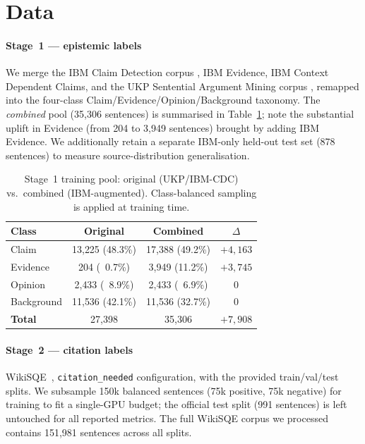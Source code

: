 \documentclass[conference]{IEEEtran}
\begin{document}
\section{Data}

\paragraph{Stage~1 — epistemic labels}
We merge the IBM Claim Detection corpus \cite{levy2014context}, IBM Evidence,
IBM Context Dependent Claims, and the UKP Sentential Argument Mining
corpus \cite{stab2014annotating}, remapped into the four-class
Claim/Evidence/Opinion/Background taxonomy. The \emph{combined} pool
(35{,}306 sentences) is summarised in Table~\ref{tab:s1corpus}; note the
substantial uplift in Evidence (from 204 to 3{,}949 sentences) brought by
adding IBM Evidence. We additionally retain a separate IBM-only held-out
test set (878 sentences) to measure source-distribution
generalisation.

\begin{table}[t]
\centering
\caption{Stage~1 training pool: original (UKP/IBM-CDC) vs.\ combined
(IBM-augmented). Class-balanced sampling is applied at training time.}
\label{tab:s1corpus}
\small
\setlength{\tabcolsep}{4.5pt}
\begin{tabular}{lccc}
\toprule
\textbf{Class} & \textbf{Original} & \textbf{Combined} & \textbf{$\Delta$} \\
\midrule
Claim       & 13{,}225 (48.3\%) & 17{,}388 (49.2\%) & $+4{,}163$ \\
Evidence    &     204 (~0.7\%) &  3{,}949 (11.2\%) & $+3{,}745$ \\
Opinion     &  2{,}433 (~8.9\%) &  2{,}433 (~6.9\%) & $0$        \\
Background  & 11{,}536 (42.1\%) & 11{,}536 (32.7\%) & $0$        \\
\midrule
\textbf{Total} & 27{,}398 & 35{,}306 & $+7{,}908$ \\
\bottomrule
\end{tabular}
\end{table}

\paragraph{Stage~2 — citation labels}
WikiSQE~\cite{wikisqe}, \texttt{citation\_needed} configuration, with the
provided train/val/test splits. We subsample 150k balanced sentences (75k
positive, 75k negative) for training to fit a single-GPU budget; the
official test split (991 sentences) is left untouched for all
reported metrics. The full WikiSQE corpus we processed contains 151{,}981
sentences across all splits.
\end{document}

